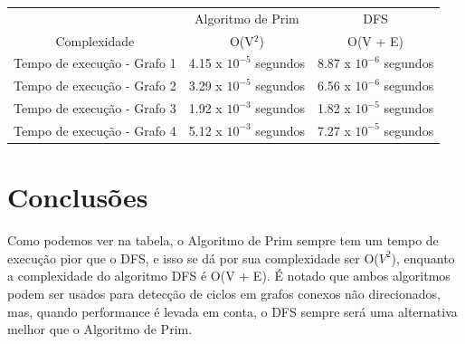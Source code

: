 \documentclass[12pt]{article}
\begin{document}
\begin{table}[ht]
    \begin{tabular}{|c|c|c|}
    \hline
    ~                           & Algoritmo de Prim          & DFS                      \\
    Complexidade                & O(V$^2$)                   & O(V + E)                 \\
    \hline
    Tempo de execução - Grafo 1 & 4.15 x $10^{-5}$ segundos  & 8.87 x $10^{-6}$ segundos\\
    \hline
    Tempo de execução - Grafo 2 & 3.29 x $10^{-5}$ segundos  & 6.56 x $10^{-6}$ segundos\\
    \hline
    Tempo de execução - Grafo 3 & 1.92 x $10^{-3}$ segundos  & 1.82 x $10^{-5}$ segundos\\
    \hline
    Tempo de execução - Grafo 4 & 5.12 x $10^{-3}$ segundos  & 7.27 x $10^{-5}$ segundos\\ 
    \hline    
    \end{tabular}
\end{table}


\section{Conclusões}
Como podemos ver na tabela, o Algoritmo de Prim sempre tem um tempo de execução pior que o DFS, e isso
se dá por sua complexidade ser O($V^2$), enquanto a complexidade do algoritmo DFS é O(V + E).
É notado que ambos algoritmos podem ser usados para detecção de ciclos em grafos conexos não direcionados, mas, quando performance
é levada em conta, o DFS sempre será uma alternativa melhor que o Algoritmo de Prim.
\end{document}
